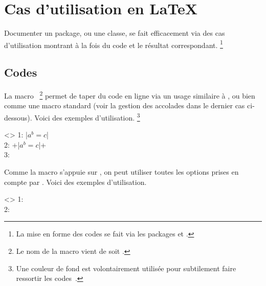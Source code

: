 \documentclass{tutodoc}
\begin{document}
\section{Cas d'utilisation en \LaTeX}
\label{tutodoc-listing-latex}

Documenter un package, ou une classe, se fait efficacement via des cas d'utilisation montrant à la fois du code et le résultat correspondant.%
\footnote{
    La mise en forme des codes se fait via les packages  et  .
}



\subsection{Codes }
\label{tutodoc-listing-latex-inline}

\begin{tdocexa}
    La macro \,%
    \footnote{
        Le nom de la macro  vient de  soit .
    }
    permet de taper du code en ligne via un usage similaire à , ou bien comme une macro standard (voir la gestion des accolades dans le dernier cas ci-dessous).
    Voici des exemples d'utilisation.%
    \footnote{
    	Une couleur de fond est volontairement utilisée pour subtilement faire ressortir les codes \tdoclatexin{\LaTeX}\,.
    }

    \begin{tdoclatex}<>
1: \tdoclatexin|$a^b = c$|               \\
2: \tdoclatexin+\tdoclatexin|$a^b = c$|+ \\
3: 
	\end{tdoclatex}
\end{tdocexa}


\begin{tdocexa}
    Comme la macro  s'appuie sur , on peut utiliser toutes les options prises en compte par .
    Voici des exemples d'utilisation.

    \begin{tdoclatex}<>
1:  \\
2: 
	\end{tdoclatex}
\end{tdocexa}
\end{document}
